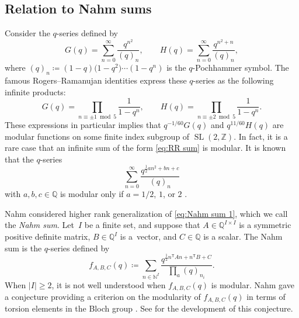 \documentclass[pdftex]{sigma}
\numberwithin{equation}{section}
\theoremstyle{definition}
\DeclareMathOperator{\SL}{SL}
\begin{document}
\subsection{Relation to Nahm sums}\label{section:nahm sum}
Consider the $q$-series defined by
\begin{equation}\label{eq:RR sum}
 G(q) = \sum_{n=0}^\infty \frac{q^{n^2}}{(q)_n} ,\qquad
 H(q) = \sum_{n=0}^\infty \frac{q^{n^2+n}}{(q)_n},
\end{equation}
where $(q)_n \coloneqq (1-q) \bigl(1-q^2\bigr) \cdots (1-q^n)$ is the $q$-Pochhammer symbol.
The famous Rogers--Ramanujan identities express these $q$-series as the following infinite products:
\begin{equation*}
 G(q) = \prod_{n \equiv \pm 1 \bmod 5} \frac{1}{1 - q^n},\qquad
 H(q) = \prod_{n \equiv \pm 2 \bmod 5} \frac{1}{1 - q^n} .
\end{equation*}
These expressions in particular implies that $q^{-1/60} G(q)$ and $q^{11/60} H(q)$ are
modular functions on some finite index subgroup of $\SL (2, \mathbb{Z})$.
In fact, it is a rare case that an infinite sum of the form \eqref{eq:RR sum} is modular. It is known that the $q$-series
\begin{equation}\label{eq:Nahm sum 1}
 \sum_{n = 0}^\infty \frac{q^{ \frac{1}{2} a n^2 + b n + c}}{(q)_{n}}
\end{equation}
with $a,b,c \in \mathbb{Q}$ is modular only if $a = 1/2$, $1$, or $2$ \cite{Zagier}.

Nahm \cite{Nahm} considered higher rank generalization of \eqref{eq:Nahm sum 1},
which we call the \emph{Nahm sum}.
Let~$I$ be a finite set, and suppose that $A \in \mathbb{Q}^{I \times I}$ is a symmetric positive definite matrix,
$B \in \mathbb{Q}^I$ is a~vector,
and $C \in \mathbb{Q}$ is a scalar.
The Nahm sum is the $q$-series defined by
\begin{equation*}
 f_{A, B, C} (q) \coloneqq \sum_{n \in \mathbb{N}^I}
 \frac{q^{ \frac{1}{2} n^\mathsf{T} A n + n^\mathsf{T} B +C}}{ \prod_a (q)_{n_i}}.
\end{equation*}
When $\lvert I \rvert \geq 2$, it is not well understood when $f_{A,B,C}(q)$ is modular.
Nahm gave a conjecture providing a criterion on the modularity of $f_{A, B, C} (q)$
in terms of torsion elements in the Bloch group \cite{Nahm, Zagier}.
See \cite{calegari2017bloch, VlasenkoZwegers} for the development of this conjecture.
\end{document}
